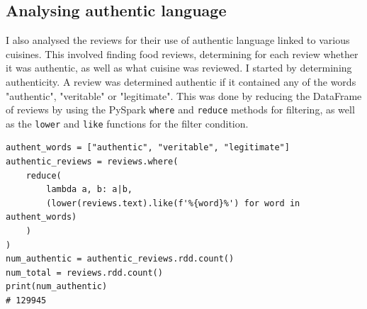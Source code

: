 \subsection{Analysing authentic language}
I also analysed the reviews for their use of authentic language linked to various cuisines. This involved finding food reviews, determining for each review whether it was authentic, as well as what cuisine was reviewed. I started by determining authenticity. A review was determined authentic if it contained any of the words "authentic", "veritable" or "legitimate". This was done by reducing the DataFrame of reviews by using the PySpark \texttt{where} and \texttt{reduce} methods for filtering, as well as the \texttt{lower} and \texttt{like} functions for the filter condition.

\begin{verbatim}
authent_words = ["authentic", "veritable", "legitimate"]
authentic_reviews = reviews.where(
    reduce(
        lambda a, b: a|b,
        (lower(reviews.text).like(f'%{word}%') for word in authent_words)
    )
)
num_authentic = authentic_reviews.rdd.count()
num_total = reviews.rdd.count()
print(num_authentic)
# 129945
\end{verbatim}

